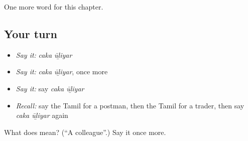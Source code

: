 \begin{grammarlens}[title={What you've built}]
One more word for this chapter.
\end{grammarlens}

\subsection*{Your turn}
\begin{itemize}
\raggedright
  \item \emph{Say it:} \emph{caka ūḻiyar}
  \item \emph{Say it:} \emph{caka ūḻiyar}, once more
  \item \emph{Say it:} say \emph{caka ūḻiyar}
  \item \emph{Recall:} say the Tamil for a postman, then the Tamil for a trader, then say \emph{caka ūḻiyar} again
\end{itemize}

\begin{tcolorbox}[breakable,colback=teal!4,colframe=teal!35!black,title={Before you move on}]
What does   mean? (\textquotedblleft{}A colleague\textquotedblright{}.) Say it once more.
\end{tcolorbox}
